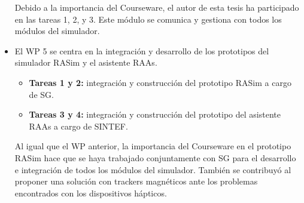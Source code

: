 \begin{itemize}
Debido a la importancia del \ac{Courseware}, el autor de esta tesis ha participado en las tareas 1, 2, y 3. Este módulo se comunica y gestiona con todos los módulos del simulador.%


\item
El \ac{WP} 5 se centra en la integración y desarrollo de los prototipos del simulador \ac{RASim} y el asistente \ac{RAAs}. %
\begin{itemize}
    \item {\textbf{Tareas 1 y 2: } integración y construcción del prototipo \ac{RASim} a cargo de \ac{SG}. 
    }
     \item {\textbf{Tareas 3 y 4: } integración y construcción del prototipo del asistente \ac{RAAs} a cargo de \ac{SINTEF}.
    }
\end{itemize}

{Al igual que el \ac{WP} anterior, la importancia del \ac{Courseware} en el prototipo \ac{RASim} hace que se haya trabajado conjuntamente con \ac{SG} para el desarrollo e integración de todos los módulos del simulador. También se contribuyó al proponer una solución con \acs{tracker}s magnéticos ante los problemas encontrados con los dispositivos hápticos.}



\end{itemize}

